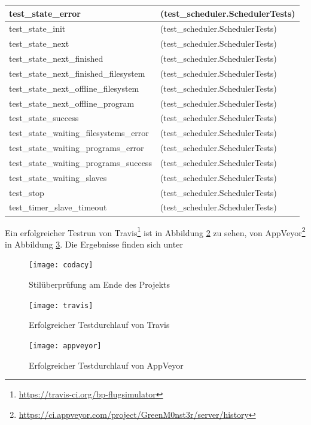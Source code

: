 \begin{longtable}{|p{10cm}|p{7cm}|}
test\_state\_error & (test\_scheduler.SchedulerTests)\\\hline
test\_state\_init & (test\_scheduler.SchedulerTests)\\\hline
test\_state\_next & (test\_scheduler.SchedulerTests)\\\hline
test\_state\_next\_finished & (test\_scheduler.SchedulerTests)\\\hline
test\_state\_next\_finished\_filesystem & (test\_scheduler.SchedulerTests)\\\hline
test\_state\_next\_offline\_filesystem & (test\_scheduler.SchedulerTests)\\\hline
test\_state\_next\_offline\_program & (test\_scheduler.SchedulerTests)\\\hline
test\_state\_success & (test\_scheduler.SchedulerTests)\\\hline
test\_state\_waiting\_filesystems\_error & (test\_scheduler.SchedulerTests)\\\hline
test\_state\_waiting\_programs\_error & (test\_scheduler.SchedulerTests)\\\hline
test\_state\_waiting\_programs\_success & (test\_scheduler.SchedulerTests)\\\hline
test\_state\_waiting\_slaves & (test\_scheduler.SchedulerTests)\\\hline
test\_stop & (test\_scheduler.SchedulerTests)\\\hline
test\_timer\_slave\_timeout & (test\_scheduler.SchedulerTests)\\\hline
\end{longtable}

Ein erfolgreicher Testrun von Travis\footnote{\url{https://travis-ci.org/bp-flugsimulator}} ist in Abbildung \ref{travis_png} zu sehen, von AppVeyor\footnote{\url{https://ci.appveyor.com/project/GreenM0nst3r/server/history}} in Abbildung \ref{appveyor_png}.
Die Ergebnisse finden sich unter 


\begin{figure}[t]
	\centering
\texttt{[image: codacy]}
	\caption{Stilüberprüfung am Ende des Projekts}
	\label{codacy_png}
\end{figure}

\begin{figure}[h]
	\centering
\texttt{[image: travis]}
	\caption{Erfolgreicher Testdurchlauf von Travis}
	\label{travis_png}
\end{figure}

\begin{figure}[h]
	\centering
\texttt{[image: appveyor]}
	\caption{Erfolgreicher Testdurchlauf von AppVeyor}
	\label{appveyor_png}
\end{figure}
